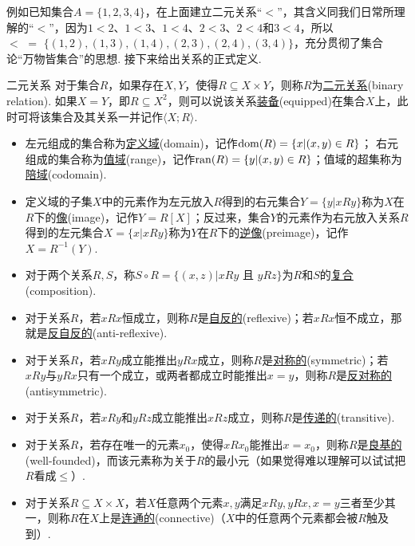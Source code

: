 \documentclass[main.tex]{subfiles}
\begin{document}
例如已知集合\(A=\{1,2,3,4\}\)，在上面建立二元关系“\(<\)”，其含义同我们日常所理解的“\(<\)”，因为\(1<2\)、\(1<3\)、\(1<4\)、\(2<3\)、\(2<4\)和\(3<4\)，所以\(<\,\,=\,\,\{(1,2),(1,3),(1,4),(2,3),(2,4),(3,4)\}\)，充分贯彻了集合论“万物皆集合”的思想. 接下来给出关系的正式定义.

\begin{definition}{二元关系}
    对于集合\(R\)，如果存在\(X,Y\)，使得\(R \subseteq X \times Y\)，则称\(R\)为\uline{二元关系}(binary relation). 如果\(X = Y\)，即\(R \subseteq X^2\)，则可以说该关系\uline{装备}(equipped)在集合\(X\)上，此时可将该集合及其关系一并记作\(\langle X; R \rangle\).
    \begin{itemize}
        \item  左元组成的集合称为\uline{定义域}(domain)，记作\({\rm dom}(R)= \{x |(x,y)\in R\}\)； 右元组成的集合称为\uline{值域}(range)，记作\({\rm ran}(R)= \{y | (x,y) \in R\}\)；值域的超集称为\uline{陪域}(codomain).
        \item  定义域的子集\(X\)中的元素作为左元放入\(R\)得到的右元集合\(Y=\{y|xRy\}\)称为\(X\)在\(R\)下的\uline{像}(image)，记作\(Y=R[X]\)；反过来，集合\(Y\)的元素作为右元放入关系\(R\)得到的左元集合\(X=\{x|xRy\}\)称为\(Y\)在\(R\)下的\uline{逆像}(preimage)，记作\(X=R^{-1}(Y)\).
        \item  对于两个关系\(R,S\)，称\(S \circ R = \{(x,z) | xRy\mbox{ 且 }yRz\}\)为\(R\)和\(S\)的\uline{复合}(composition).
        \item  对于关系\(R\)，若\(xRx\)恒成立，则称\(R\)是\uline{自反的}(reflexive)；若\(xRx\)恒不成立，那就是\uline{反自反的}(anti-reflexive).
        \item  对于关系\(R\)，若\(xRy\)成立能推出\(yRx\)成立，则称\(R\)是\uline{对称的}(symmetric)；若\(xRy\)与\(yRx\)只有一个成立，或两者都成立时能推出\(x=y\)，则称\(R\)是\uline{反对称的}(antisymmetric).
        \item  对于关系\(R\)，若\(xRy\)和\(yRz\)成立能推出\(xRz\)成立，则称\(R\)是\uline{传递的}(transitive).
        \item  对于关系\(R\)，若存在唯一的元素\(x_0\)，使得\(xRx_0\)能推出\(x=x_0\)，则称\(R\)是\uline{良基的}(well-founded)，而该元素称为关于\(R\)的最小元（如果觉得难以理解可以试试把\(R\)看成\(\leq\)）.
        \item  对于关系\(R \subseteq X \times X\)，若\(X\)任意两个元素\(x,y\)满足\(xRy,yRx,x=y\)三者至少其一，则称\(R\)在\(X\)上是\uline{连通的}(connective)（\(X\)中的任意两个元素都会被\(R\)触及到）.
    \end{itemize}
\end{definition}
\end{document}
